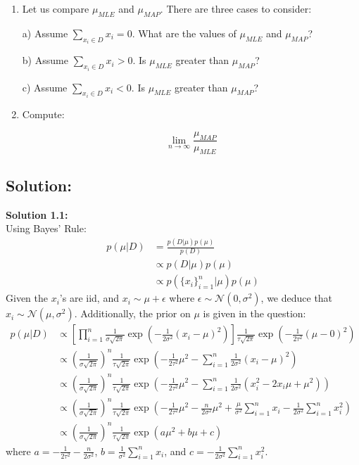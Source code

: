 \documentclass[submit]{harvardml}
\begin{document}
\begin{problem}
\begin{enumerate}
\item Let us compare $\mu_{MLE}$  and $\mu_{MAP}$. There are three cases to consider:

 a) Assume $\sum_{x_i \in D} x_i=0$. What are the values of $\mu_{MLE}$ and $\mu_{MAP}$?

 b) Assume $\sum_{x_i \in D} x_i>0$. Is $\mu_{MLE}$ greater than $\mu_{MAP}$?

 c) Assume $\sum_{x_i \in D} x_i<0$. Is $\mu_{MLE}$ greater than $\mu_{MAP}$?
  
    
\item Compute:

$$\lim_{n \rightarrow \infty} \frac{\mu_{MAP}}{\mu_{MLE}}$$

  \end{enumerate}

  \end{problem}
\newpage

\subsection*{Solution:}
\noindent\textbf{Solution 1.1:}\\
Using Bayes' Rule:
\begin{align*}
    p(\mu|D) &= \frac{p(D|\mu)p(\mu)}{p(D)}\\
    &\propto p(D|\mu)p(\mu)\\
    &\propto p(\{x_i\}_{i=1}^{n}|\mu)p(\mu)
\end{align*}
Given the $x_i$'s are iid, and $x_i \sim \mu + \epsilon$ where $\epsilon \sim\mathcal{N}(0,\sigma^2)$, we deduce that $x_i \sim \mathcal{N}(\mu,\sigma^2)$. Additionally, the prior on $\mu$ is given in the question:
\begin{align*}
     p(\mu|D) &\propto \left[ \prod_{i=1}^{n} \frac{1}{\sigma\sqrt{2\pi}} \exp\left( -\frac{1}{2 \sigma^2}\left(x_i-\mu\right)^{2}\right) \right] \frac{1}{\tau\sqrt{2\pi}} \exp\left( -\frac{1}{2 \tau^2}\left(\mu - 0\right)^{2}\right)\\
    &\propto \left(\frac{1}{\sigma\sqrt{2\pi}}\right)^n \frac{1}{\tau\sqrt{2\pi}} \exp\left(-\frac{1}{2 \tau^2}\mu^{2} - \sum_{i=1}^{n} \frac{1}{2 \sigma^2}\left(x_i-\mu\right)^{2}\right)\\
    &\propto \left(\frac{1}{\sigma\sqrt{2\pi}}\right)^n \frac{1}{\tau\sqrt{2\pi}} \exp\left(-\frac{1}{2 \tau^2}\mu^{2} - \sum_{i=1}^{n} \frac{1}{2 \sigma^2}\left(x_i^2-2 x_i \mu + \mu^2 \right)\right)\\
    &\propto \left(\frac{1}{\sigma\sqrt{2\pi}}\right)^n \frac{1}{\tau\sqrt{2\pi}} \exp\left(-\frac{1}{2 \tau^2}\mu^{2} - \frac{n}{2 \sigma^2}\mu^{2} + \frac{\mu}{\sigma^2} \sum_{i=1}^{n} x_i - \frac{1}{2 \sigma^2} \sum_{i=1}^{n} x_i^2\right)\\
    &\propto \left(\frac{1}{\sigma\sqrt{2\pi}}\right)^n \frac{1}{\tau\sqrt{2\pi}} \exp\left(a\mu^2 + b\mu + c\right)
\end{align*}
where $a = -\frac{1}{2 \tau^2} - \frac{n}{2 \sigma^2}$, $b = \frac{1}{\sigma^2} \sum_{i=1}^{n} x_i$, and $c = - \frac{1}{2 \sigma^2} \sum_{i=1}^{n} x_i^2$.\\
\end{document}
